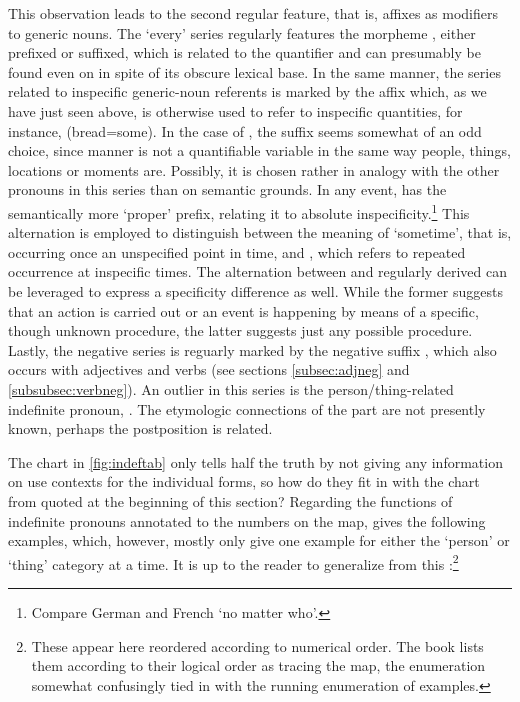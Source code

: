 This observation leads to the second regular feature, that is, affixes as 
modifiers to generic nouns. The `every' series regularly features the 
morpheme , either prefixed or suffixed, which is related to the 
quantifier  and can presumably be found 
even on  in spite of its obscure lexical base. In the same 
manner, the series related to inspecific generic-noun referents is marked by 
the affix  which, as we have just seen above, is otherwise 
used to refer to inspecific quantities, for instance, 
 (bread=some). In the case of 
, the suffix seems somewhat of an 
odd choice, since manner is not a quantifiable variable in the same way people,
things, locations or moments are. Possibly, it is chosen rather in analogy with
the other pronouns in this series than on semantic grounds. In any event,
 has the semantically more `proper'  prefix,
relating it to absolute inspecificity.\footnote{Compare German
 and French  `no matter who'.} This 
alternation is employed to distinguish between the meaning of `sometime', that 
is, occurring once an unspecified point in time, and 
, which refers to repeated occurrence at
inspecific times. The alternation between  and
regularly derived  can be leveraged to express a
specificity difference as well. While the former suggests that an action is
carried out or an event is happening by means of a specific, though unknown
procedure, the latter suggests just any possible procedure. Lastly, the
negative series is reguarly marked by the negative suffix ,
which also occurs with adjectives and verbs (see sections \ref{subsec:adjneg}
and \ref{subsubsec:verbneg}). An outlier in this series is the 
person/thing-related indefinite pronoun, . The etymologic 
connections of the  part are not presently known, perhaps the 
postposition  is related.

The chart in \autoref{fig:indeftab} only tells half the truth by not giving any
information on use contexts for the individual forms, so how do they fit in
with the chart from \citet{haspelmath1997} quoted at the beginning of this
section? Regarding the functions of indefinite pronouns annotated to the
numbers on the map, \citet{haspelmath1997} gives the following examples, which,
however, mostly only give one example for either the `person' or `thing'
category at a time. It is up to the reader to generalize from this 
\citep[2--3]{haspelmath1997}:\footnote{These appear here reordered according 
to numerical order. The book lists them according to their logical order as 
tracing the map, the enumeration somewhat confusingly tied in with the running 
enumeration of examples.}

